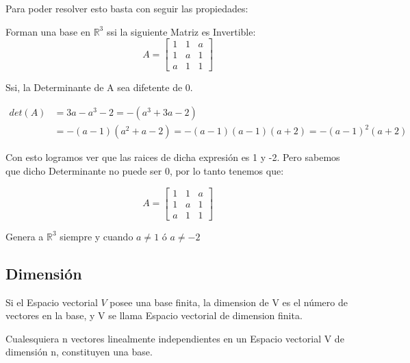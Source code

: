 \documentclass[12pt]{report}							    %
\begin{document}
            Para poder resolver esto basta con seguir las propiedades:

            Forman una base en $\mathbb{R}^3$ ssi la siguiente Matriz es Invertible:
            \begin{equation*}
                A = \begin{bmatrix} 1 & 1 & a \\ 1 & a & 1 \\ a & 1 & 1 \end{bmatrix}
            \end{equation*}

            Ssi, la Determinante de A sea difetente de 0.

            \begin{equation*}
            \begin{split}
            det(A) & = 3a-a^3-2 = -(a^3+3a-2) \\
                   & = - (a-1)(a^2+a-2) = -(a-1)(a-1)(a+2) = -(a-1)^2(a+2)
            \end{split}
            \end{equation*}

            Con esto logramos ver que las raices de dicha expresión es 1 y -2.
            Pero sabemos que dicho Determinante no puede ser 0, por lo tanto tenemos que:

            \begin{equation*}
                A = \begin{bmatrix} 1 & 1 & a \\ 1 & a & 1 \\ a & 1 & 1 \end{bmatrix}
            \end{equation*}

            Genera a $\mathbb{R}^3$ siempre y cuando $a \neq 1$ ó $a \neq -2$ 


        \clearpage
        \subsection{Dimensión}
        Si el Espacio vectorial $V$ posee una base finita, la dimension de V es el 
        número de vectores en la base, y V se llama Espacio vectorial de dimension finita.

        Cualesquiera n vectores linealmente independientes en un Espacio
        vectorial V de dimensión n, constituyen una base.
\end{document}

